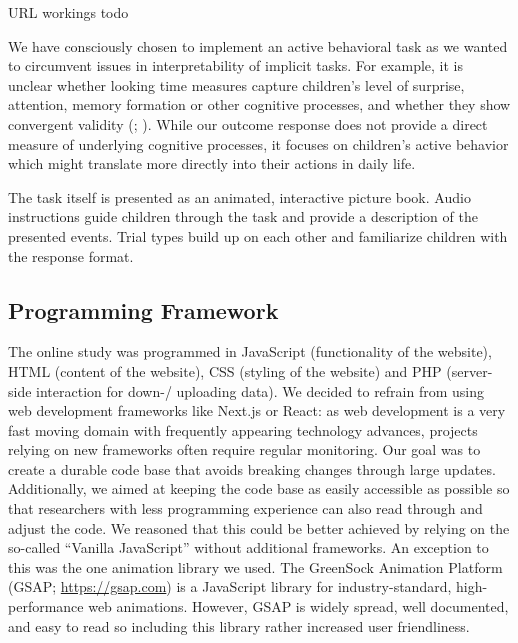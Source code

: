 \documentclass[
]{scrbook}
\begin{document}
URL workings todo

We have consciously chosen to implement an active behavioral task as we wanted to circumvent issues in interpretability of implicit tasks. For example, it is unclear whether looking time measures capture children's level of surprise, attention, memory formation or other cognitive processes, and whether they show convergent validity (; ). While our outcome response does not provide a direct measure of underlying cognitive processes, it focuses on children's active behavior which might translate more directly into their actions in daily life.

The task itself is presented as an animated, interactive picture book. Audio instructions guide children through the task and provide a description of the presented events. Trial types build up on each other and familiarize children with the response format.

\subsection{Programming Framework}\label{programmingframework}

The online study was programmed in JavaScript (functionality of the website), HTML (content of the website), CSS (styling of the website) and PHP (server-side interaction for down-/ uploading data). We decided to refrain from using web development frameworks like Next.js or React: as web development is a very fast moving domain with frequently appearing technology advances, projects relying on new frameworks often require regular monitoring. Our goal was to create a durable code base that avoids breaking changes through large updates. Additionally, we aimed at keeping the code base as easily accessible as possible so that researchers with less programming experience can also read through and adjust the code. We reasoned that this could be better achieved by relying on the so-called ``Vanilla JavaScript'' without additional frameworks. An exception to this was the one animation library we used. The GreenSock Animation Platform (GSAP; \mbox{\url{https://gsap.com}}) is a JavaScript library for industry-standard, high-performance web animations. However, GSAP is widely spread, well documented, and easy to read so including this library rather increased user friendliness.
\end{document}
